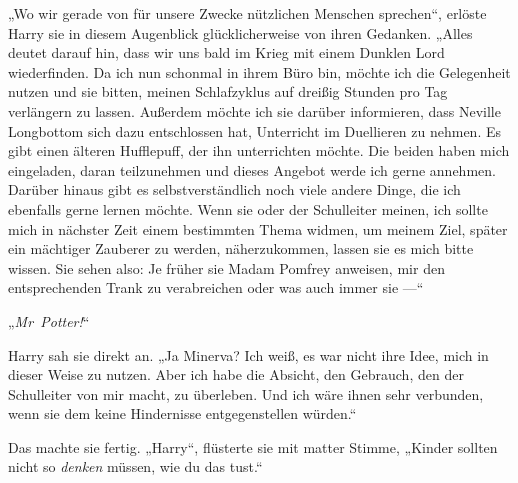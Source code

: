 „Wo wir gerade von für unsere Zwecke nützlichen Menschen sprechen“, erlöste Harry sie in diesem Augenblick glücklicherweise von ihren Gedanken.
„Alles deutet darauf hin, dass wir uns bald im Krieg mit einem Dunklen Lord wiederfinden. Da ich nun schonmal in ihrem Büro bin, möchte ich die Gelegenheit nutzen und sie bitten, meinen Schlafzyklus auf dreißig Stunden pro Tag verlängern zu lassen. Außerdem möchte ich sie darüber informieren, dass Neville Longbottom sich dazu entschlossen hat, Unterricht im Duellieren zu nehmen. Es gibt einen älteren Hufflepuff, der ihn unterrichten möchte. Die beiden haben mich eingeladen, daran teilzunehmen und dieses Angebot werde ich gerne annehmen. Darüber hinaus gibt es selbstverständlich noch viele andere Dinge, die ich ebenfalls gerne lernen möchte. Wenn sie oder der Schulleiter meinen, ich sollte mich in nächster Zeit einem bestimmten Thema widmen, um meinem Ziel, später ein mächtiger Zauberer zu werden, näherzukommen, lassen sie es mich bitte wissen. Sie sehen also: Je früher sie Madam Pomfrey anweisen, mir den entsprechenden Trank zu verabreichen oder was auch immer sie —“

„\emph{Mr~Potter!}“

Harry sah sie direkt an.
„Ja Minerva? Ich weiß, es war nicht ihre Idee, mich in dieser Weise zu nutzen. Aber ich habe die Absicht, den Gebrauch, den der Schulleiter von mir macht, zu überleben. Und ich wäre ihnen sehr verbunden, wenn sie dem keine Hindernisse entgegenstellen würden.“

Das machte sie fertig.
„Harry“, flüsterte sie mit matter Stimme,
„Kinder sollten nicht so \emph{denken} müssen, wie du das tust.“


